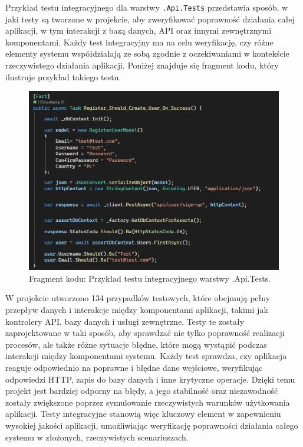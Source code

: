 \documentclass[12pt,a4paper]{article}
\begin{document}
\newpage

\noindent 
Przykład testu integracyjnego dla warstwy \texttt{.Api.Tests} przedstawia sposób, w jaki testy są tworzone w projekcie, aby zweryfikować poprawność działania całej aplikacji, w tym interakcji z bazą danych, API oraz innymi zewnętrznymi komponentami. Każdy test integracyjny ma na celu weryfikację, czy różne elementy systemu współdziałają ze sobą zgodnie z oczekiwaniami w kontekście rzeczywistego działania aplikacji. Poniżej znajduje się fragment kodu, który ilustruje przykład takiego testu.

\vspace{0.5cm}
\begin{figure}[h!]
    \centering
    \includegraphics[width=1\textwidth]{images/ex_api_test.png}
    \caption{Fragment kodu: Przykład testu integracyjnego warstwy .Api.Tests.}
\end{figure}
\vspace{0.5cm}

W projekcie utworzono 134 przypadków testowych, które obejmują pełny przepływ danych i interakcje między komponentami aplikacji, takimi jak kontrolery API, bazy danych i usługi zewnętrzne. Testy te zostały zaprojektowane w taki sposób, aby sprawdzać nie tylko poprawność realizacji procesów, ale także różne sytuacje błędne, które mogą wystąpić podczas interakcji między komponentami systemu. Każdy test sprawdza, czy aplikacja reaguje odpowiednio na poprawne i błędne dane wejściowe, weryfikując odpowiedzi HTTP, zapis do bazy danych i inne krytyczne operacje. Dzięki temu projekt jest bardziej odporny na błędy, a jego stabilność oraz niezawodność zostały zwiększone poprzez symulowanie rzeczywistych warunków użytkowania aplikacji. Testy integracyjne stanowią więc kluczowy element w zapewnieniu wysokiej jakości aplikacji, umożliwiając weryfikację poprawności działania całego systemu w złożonych, rzeczywistych scenariuszach.
\end{document}

